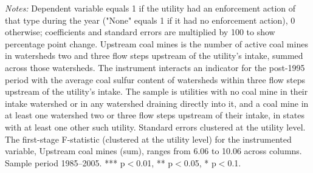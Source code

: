 \begin{table}[htbp]
\begin{minipage}{\linewidth}
\textit{Notes:} Dependent variable equals 1 if the utility had an enforcement action of that type during the year ("None" equals 1 if it had no enforcement action), 0 otherwise; coefficients and standard errors are multiplied by 100 to show percentage point change. Upstream coal mines is the number of active coal mines in watersheds two and three flow steps upstream of the utility's intake, summed across those watersheds. The instrument interacts an indicator for the post-1995 period with the average coal sulfur content of watersheds within three flow steps upstream of the utility's intake. The sample is utilities with no coal mine in their intake watershed or in any watershed draining directly into it, and a coal mine in at least one watershed two or three flow steps upstream of their intake, in states with at least one other such utility. Standard errors clustered at the utility level. The first-stage F-statistic (clustered at the utility level) for the instrumented variable, Upstream coal mines (sum), ranges from 6.06 to 10.06 across columns. Sample period 1985--2005. *** p$<$0.01, ** p$<$0.05, * p$<$0.1.
\end{minipage}
\end{table}

